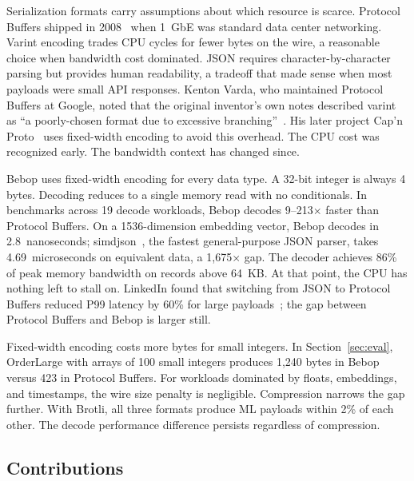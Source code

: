 \documentclass[10pt,onecolumn]{article}
\begin{document}
Serialization formats carry assumptions about which resource is scarce. Protocol Buffers shipped in 2008~\cite{varda-protobuf-announcement} when 1~GbE was standard data center networking. Varint encoding trades CPU cycles for fewer bytes on the wire, a reasonable choice when bandwidth cost dominated. JSON requires character-by-character parsing but provides human readability, a tradeoff that made sense when most payloads were small API responses. Kenton Varda, who maintained Protocol Buffers at Google, noted that the original inventor's own notes described varint as ``a poorly-chosen format due to excessive branching''~\cite{varda-hn}. His later project Cap'n Proto~\cite{capnproto} uses fixed-width encoding to avoid this overhead. The CPU cost was recognized early. The bandwidth context has changed since.

Bebop uses fixed-width encoding for every data type. A 32-bit integer is always 4 bytes. Decoding reduces to a single memory read with no conditionals. In benchmarks across 19 decode workloads, Bebop decodes 9--213$\times$ faster than Protocol Buffers. On a 1536-dimension embedding vector, Bebop decodes in 2.8~nanoseconds; simdjson~\cite{simdjson}, the fastest general-purpose JSON parser, takes 4.69~microseconds on equivalent data, a 1,675$\times$ gap. The decoder achieves 86\% of peak memory bandwidth on records above 64~KB. At that point, the CPU has nothing left to stall on. LinkedIn found that switching from JSON to Protocol Buffers reduced P99 latency by 60\% for large payloads~\cite{linkedin-protobuf}; the gap between Protocol Buffers and Bebop is larger still.

Fixed-width encoding costs more bytes for small integers. In Section~\ref{sec:eval}, OrderLarge with arrays of 100 small integers produces 1,240 bytes in Bebop versus 423 in Protocol Buffers. For workloads dominated by floats, embeddings, and timestamps, the wire size penalty is negligible. Compression narrows the gap further. With Brotli, all three formats produce ML payloads within 2\% of each other. The decode performance difference persists regardless of compression.

\subsection{Contributions}
\end{document}
